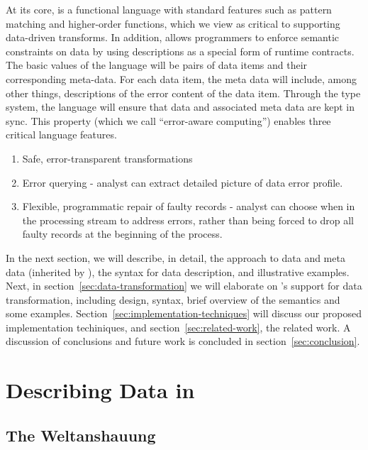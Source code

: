 \documentclass{entcs}
\begin{document}
At its core, \datatype{} is a functional language with standard
features such as pattern matching and higher-order functions, which we
view as critical to supporting data-driven transforms. In addition,
\datatype{} allows programmers to enforce semantic constraints on
data by using \datatype{} descriptions as a special form of runtime
contracts. The basic values of the language will be pairs of data
items and their corresponding meta-data. For each data item, the meta
data will include, among other things, descriptions of the error
content of the data item. Through the type system, the language will
ensure that data and associated meta data are kept in sync. This
property (which we call ``error-aware computing'') enables three
critical language features.
\begin{enumerate}
\item Safe, error-transparent transformations
\item Error querying - analyst can extract detailed picture of data
  error profile.
\item Flexible, programmatic repair of faulty records - analyst can
  choose when in the processing stream to address errors, rather than
  being forced to drop all faulty records at the beginning of the process.
\end{enumerate}

In the next section, we will describe, in detail, the \pads{} approach
to data and meta data (inherited by \datatype{}), the \datatype{}
syntax for data description, and illustrative examples. Next, in
section~\ref{sec:data-transformation} we will elaborate on \datatype{}'s support for
data transformation, including design, syntax, brief overview of the semantics
and some examples. Section~\ref{sec:implementation-techniques} will discuss our proposed
implementation techiniques, and section~\ref{sec:related-work}, the
related work. A discussion of conclusions and future work is concluded
in section~\ref{sec:conclusion}.

\section{Describing Data in \datatype{}}
\label{sec:data-description}

\subsection{The \pads{} Weltanshauung}
\end{document}
